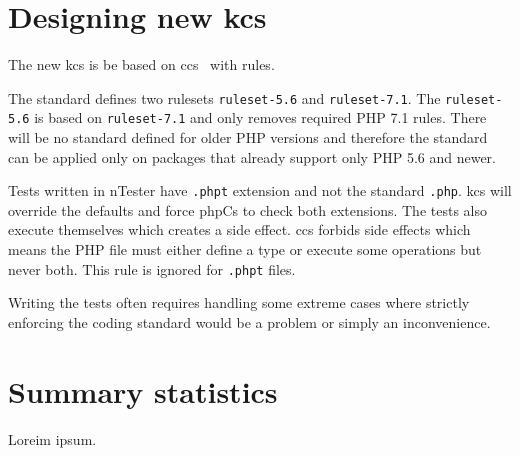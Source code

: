 \section{Designing new \acrlong{kcs}}

The new \gls{kcs} is be based on \gls{ccs}~\cite{consistence:coding-standard} with  rules.

The standard defines two rulesets \lstinline{ruleset-5.6} and \lstinline{ruleset-7.1}. The \lstinline{ruleset-5.6} is based on \lstinline{ruleset-7.1} and only removes required PHP 7.1 rules. There will be no standard defined for older PHP versions and therefore the standard can be applied only on packages that already support only PHP 5.6 and newer.


Tests written in \gls{nTester} have \lstinline{.phpt} extension and not the standard \lstinline{.php}. \gls{kcs} will override the defaults and force \gls{phpCs} to check both extensions. The tests also execute themselves which creates a side effect. \gls{ccs} forbids side effects which means the PHP file must either define a type or execute some operations but never both. This rule is ignored for \lstinline{.phpt} files.

Writing the tests often requires handling some extreme cases where strictly enforcing the coding standard would be a problem or simply an inconvenience.




\section{Summary statistics}

Loreim ipsum.
